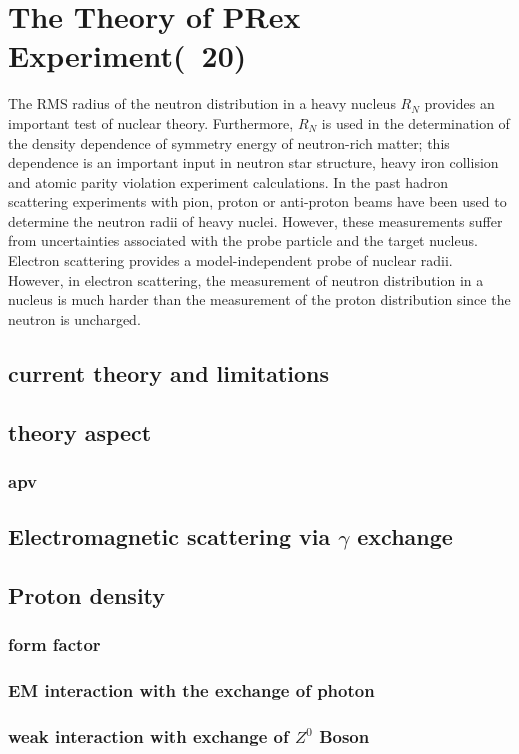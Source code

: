 \chapter{The Theory of PRex Experiment(~20)}

The RMS radius of the  neutron distribution in a heavy nucleus  $R_N$ provides an important test of nuclear theory. Furthermore,   $R_N$ is used in the determination of  the density dependence of symmetry energy of neutron-rich matter; this dependence is an  important input in   neutron star structure, heavy iron collision and atomic parity violation experiment calculations. In the past hadron scattering experiments with pion, proton or anti-proton beams have been used to determine the neutron radii of heavy nuclei. However, these measurements suffer from uncertainties associated with the probe particle and the target nucleus. Electron scattering provides a model-independent probe of nuclear radii.  However, in electron scattering, the measurement of neutron distribution in a nucleus  is much harder than the measurement of the proton distribution  since the neutron is uncharged. 
\section{current theory and limitations}
\section{theory aspect}
\subsection{apv}
\section{Electromagnetic scattering via $\gamma$ exchange}
\section{Proton density}
\subsection{form factor}
\subsection{EM interaction with the exchange of photon}
\subsection{weak interaction with exchange of $Z^0$ Boson}
